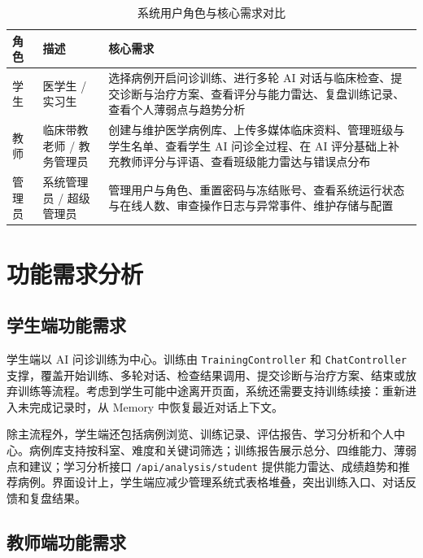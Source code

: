\begin{table}[H]
    \centering
    \caption{系统用户角色与核心需求对比}
    \label{tab:roles}
    \begin{tabular}{ll p{8cm}}
        \toprule
        角色 & 描述 & 核心需求 \\
        \midrule
        学生 & 医学生 / 实习生 & 选择病例开启问诊训练、进行多轮 AI 对话与临床检查、提交诊断与治疗方案、查看评分与能力雷达、复盘训练记录、查看个人薄弱点与趋势分析 \\
        教师 & 临床带教老师 / 教务管理员 & 创建与维护医学病例库、上传多媒体临床资料、管理班级与学生名单、查看学生 AI 问诊全过程、在 AI 评分基础上补充教师评分与评语、查看班级能力雷达与错误点分布 \\
        管理员 & 系统管理员 / 超级管理员 & 管理用户与角色、重置密码与冻结账号、查看系统运行状态与在线人数、审查操作日志与异常事件、维护存储与配置 \\
        \bottomrule
    \end{tabular}
\end{table}

\section{功能需求分析}

\subsection{学生端功能需求}

学生端以 AI 问诊训练为中心。训练由 \texttt{TrainingController} 和 \texttt{ChatController} 支撑，覆盖开始训练、多轮对话、检查结果调用、提交诊断与治疗方案、结束或放弃训练等流程。考虑到学生可能中途离开页面，系统还需要支持训练续接：重新进入未完成记录时，从 Memory 中恢复最近对话上下文。

除主流程外，学生端还包括病例浏览、训练记录、评估报告、学习分析和个人中心。病例库支持按科室、难度和关键词筛选；训练报告展示总分、四维能力、薄弱点和建议；学习分析接口 \texttt{/api/analysis/student} 提供能力雷达、成绩趋势和推荐病例。界面设计上，学生端应减少管理系统式表格堆叠，突出训练入口、对话反馈和复盘结果。

\subsection{教师端功能需求}

